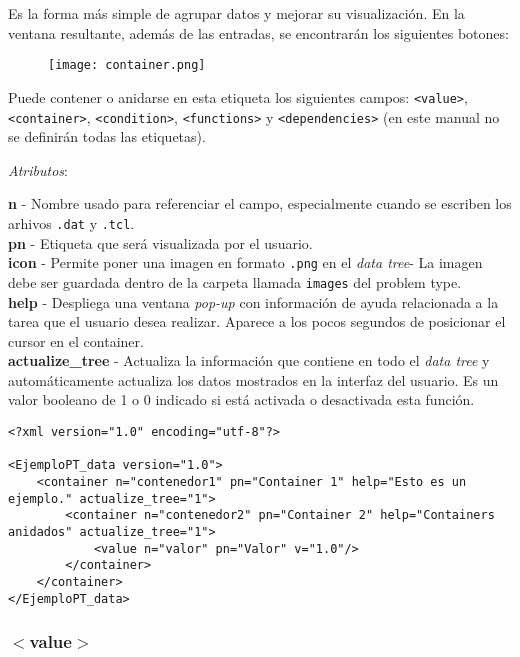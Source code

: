\documentclass[10pt, a4paper, twocolumn]{article} %
\begin{document}
Es la forma más simple de agrupar datos y mejorar su visualización. En la ventana resultante, además de las entradas, se encontrarán los siguientes botones:

\begin{figure}[hbtp!]
	\centering
	\texttt{[image: container.png]}
\end{figure}

Puede contener o anidarse en esta etiqueta los siguientes campos: \texttt{<value>}, \texttt{<container>}, \texttt{<condition>}, \texttt{<functions>} y \texttt{<dependencies>} (en este manual no se definirán todas las etiquetas).

\vspace{0.15cm}
\textit{Atributos}:

\vspace{0.15cm}
	\textbf{n} - Nombre usado para referenciar el campo, especialmente cuando se escriben los arhivos \texttt{.dat} y \texttt{.tcl}.\\
	\textbf{pn} - Etiqueta que será visualizada por el usuario.\\
	\textbf{icon} - Permite poner una imagen en formato \texttt{.png} en el \textit{data tree}- La imagen debe ser guardada dentro de la carpeta llamada \texttt{images} del problem type.\\
	\textbf{help} - Despliega una ventana \textit{pop-up} con información de ayuda relacionada a la tarea que el usuario desea realizar. Aparece a los pocos segundos de posicionar el cursor en el container.\\
	\textbf{actualize\_tree} - Actualiza la información que contiene en todo el \textit{data tree} y automáticamente actualiza los datos mostrados en la interfaz del usuario. Es un valor booleano de 1 o 0 indicado si está activada o desactivada esta función.
\vspace{0.15cm}

\lstset{language=XML} 
\begin{lstlisting}
<?xml version="1.0" encoding="utf-8"?>

<EjemploPT_data version="1.0">
	<container n="contenedor1" pn="Container 1" help="Esto es un ejemplo." actualize_tree="1">
		<container n="contenedor2" pn="Container 2" help="Containers anidados" actualize_tree="1">
			<value n="valor" pn="Valor" v="1.0"/>
		</container>
	</container>
</EjemploPT_data>
\end{lstlisting}

\subsubsection{$<$value$>$}
\end{document}
